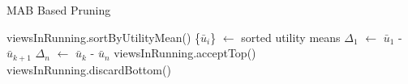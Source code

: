 


\begin{algorithm}
\caption{MAB Based Pruning}
\label{algo:mab_based_pruning}
\begin{algorithmic}[1]
\State viewsInRunning.sortByUtilityMean()
\State \{$\bar{u}_{i}$\} $\gets$ sorted utility means
\State $\Delta_1$ $\gets$ $\bar{u}_{1}$ - $\bar{u}_{k+1}$
\State $\Delta_n$ $\gets$ $\bar{u}_{k}$ - $\bar{u}_{n}$
\State viewsInRunning.acceptTop()
\Else
\State viewsInRunning.discardBottom()
\EndIf
\end{algorithmic}
\end{algorithm}






